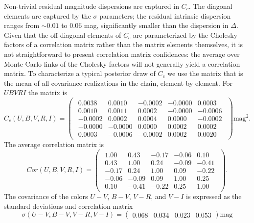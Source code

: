 \documentclass{aastex61}   	%
\begin{document}
Non-trivial residual magnitude dispersions are captured in $C_c$.  The diagonal elements are captured by the $\sigma$ parameters;
the residual intrinsic dispersion ranges from
$\sim 0.01$ to 0.06 mag, significantly smaller
than the dispersion in $\Delta$.  Given that the 
off-diagonal elements of $C_c$ are parameterized by the Cholesky factors of a correlation matrix rather than the matrix elements themselves,
it is not straightforward to present correlation matrix confidences:
the average over Monte Carlo links of the
Cholesky factors will not  generally yield a correlation matrix.  
To characterize a typical posterior draw of $C_c$ we use the matrix that is the mean of all covariance realizations in the
chain, element by element.
For $UBVRI$ the matrix is
\begin{equation}
C_c(U,B,V,R,I)=
\begin{pmatrix}
\begin{array}{rrrrr}
0.0038 & 0.0010 & -0.0002 & -0.0000 & 0.0003 \\
0.0010 & 0.0011 & 0.0002 & -0.0000 & -0.0006 \\
-0.0002 & 0.0002 & 0.0004 & 0.0000 & -0.0002 \\
-0.0000 & -0.0000 & 0.0000 & 0.0002 & 0.0002 \\
0.0003 & -0.0006 & -0.0002 & 0.0002 & 0.0020
\end{array}
 \end{pmatrix} \text{mag}^2.
 \label{mag_cov:eqn}
 \end{equation}
\color{red}
The average correlation matrix is
\begin{equation}
Cor(U,B,V,R,I)=
\begin{pmatrix}
\begin{array}{rrrrr}
1.00 & 0.43 & -0.17 & -0.06 & 0.10 \\
0.43 & 1.00 & 0.24 & -0.09 & -0.41 \\
-0.17 & 0.24 & 1.00 & 0.09 & -0.22 \\
-0.06 & -0.09 & 0.09 & 1.00 & 0.25 \\
0.10 & -0.41 & -0.22 & 0.25 & 1.00
\end{array}
 \end{pmatrix}.
 \end{equation}
 \color{black}
The  covariance of the colors $U-V$, $B-V$, $V-R$, and $V-I$ is
expressed as the standard deviations and
 correlation matrix
 \begin{equation}
 \sigma(U-V, B-V, V-R, V-I)=
 \begin{pmatrix}
0.068 & 0.034& 0.023 & 0.053
  \end{pmatrix} \text{mag}
 \label{color_sd:eqn}
   \end{equation}
\end{document}
